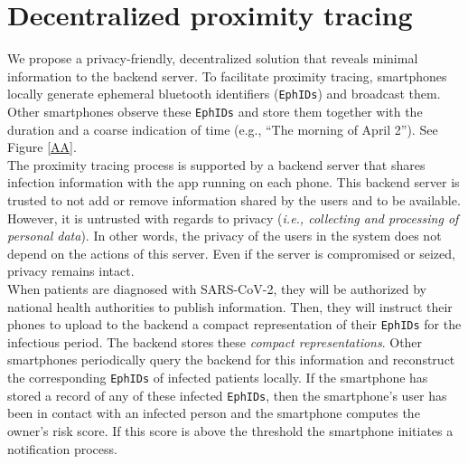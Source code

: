 \documentclass[12pt,a4paper]{article}
\begin{document}
\section*{Decentralized proximity tracing}
We propose a privacy-friendly, decentralized solution that reveals minimal information to the backend server. To facilitate proximity tracing, smartphones locally generate ephemeral bluetooth identifiers (\texttt{EphIDs}) and broadcast them. Other smartphones observe these \texttt{EphIDs} and store them together with the duration and a coarse indication of time (e.g., “The morning of April 2”). See Figure \ref{AA}.\\[0.3cm]
The proximity tracing process is supported by a backend server that shares infection
information with the app running on each phone. This backend server is trusted to not add or remove information shared by the users and to be available. However, it is untrusted with regards to privacy (\textit{i.e., collecting and processing of personal data}). In other words, the privacy of the users in the system does not depend on the actions of this server. Even if the server is compromised or seized, privacy remains intact.\\[0.3cm]
When patients are diagnosed with SARS-CoV-2, they will be authorized by national health
authorities to publish information. Then, they will instruct their phones to upload to the
backend a compact representation of their \texttt{EphIDs} for the infectious period. The backend stores these \textit{compact representations}. Other smartphones periodically query the backend for this information and reconstruct the corresponding \texttt{EphIDs} of infected patients locally. If the smartphone has stored a record of any of these infected \texttt{EphIDs}, then the smartphone’s user has been in contact with an infected person and the smartphone computes the owner’s risk score. If this score is above the threshold the smartphone initiates a notification process.
\end{document}

